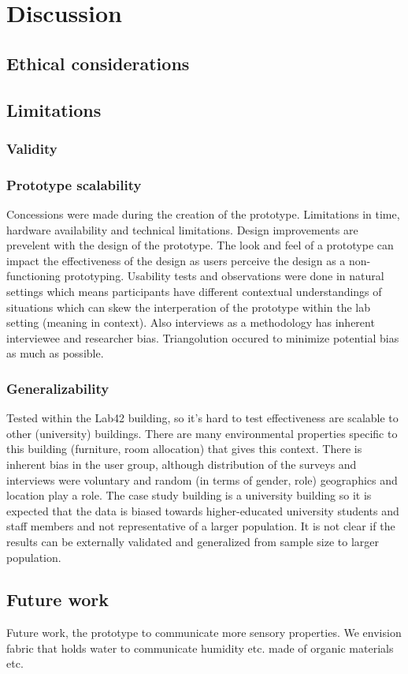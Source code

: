 \section{Discussion}
\label{sec:discussion}

\subsection{Ethical considerations}

\subsection{Limitations}

\subsubsection{Validity}


\subsubsection{Prototype scalability}
Concessions were made during the creation of the prototype. Limitations in time, hardware availability and technical limitations. Design improvements are prevelent with the design of the prototype. The look and feel of a prototype can impact the effectiveness of the design as users perceive the design as a non-functioning prototyping. Usability tests and observations were done in natural settings which means participants have different contextual understandings of situations which can skew the interperation of the prototype within the lab setting (meaning in context). Also interviews as a methodology has inherent interviewee and researcher bias. Triangolution occured to minimize potential bias as much as possible.

\subsubsection{Generalizability}
Tested within the Lab42 building, so it's hard to test effectiveness are scalable to other (university) buildings. There are many environmental properties specific to this building (furniture, room allocation) that gives this context. There is inherent bias in the user group, although distribution of the surveys and interviews were voluntary and random (in terms of gender, role) geographics and location play a role. The case study building is a university building so it is expected that the data is biased towards higher-educated university students and staff members and not representative of a larger population. It is not clear if the results can be externally validated and generalized from sample size to larger population.

\subsection{Future work}

Future work, the prototype to communicate more sensory properties. We envision fabric that holds water to communicate humidity etc. made of organic materials etc.